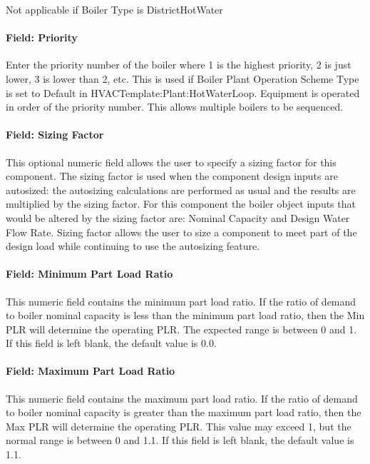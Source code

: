 Not applicable if Boiler Type is DistrictHotWater

\paragraph{Field: Priority}\label{field-priority-4}

Enter the priority number of the boiler where 1 is the highest priority, 2 is just lower, 3 is lower than 2, etc. This is used if Boiler Plant Operation Scheme Type is set to Default in HVACTemplate:Plant:HotWaterLoop. Equipment is operated in order of the priority number. This allows multiple boilers to be sequenced.

\paragraph{Field: Sizing Factor}\label{field-sizing-factor-1-000}

This optional numeric field allows the user to specify a sizing factor for this component. The sizing factor is used when the component design inputs are autosized: the autosizing calculations are performed as usual and the results are multiplied by the sizing factor. For this component the boiler object inputs that would be altered by the sizing factor are: Nominal Capacity and Design Water Flow Rate. Sizing factor allows the user to size a component to meet part of the design load while continuing to use the autosizing feature.

\paragraph{Field: Minimum Part Load Ratio}\label{field-minimum-part-load-ratio-1-000}

This numeric field contains the minimum part load ratio. If the ratio of demand to boiler nominal capacity is less than the minimum part load ratio, then the Min PLR will determine the operating PLR. The expected range is between 0 and 1. If this field is left blank, the default value is 0.0.

\paragraph{Field: Maximum Part Load Ratio}\label{field-maximum-part-load-ratio-1-000}

This numeric field contains the maximum part load ratio. If the ratio of demand to boiler nominal capacity is greater than the maximum part load ratio, then the Max PLR will determine the operating PLR. This value may exceed 1, but the normal range is between 0 and 1.1. If this field is left blank, the default value is 1.1.

